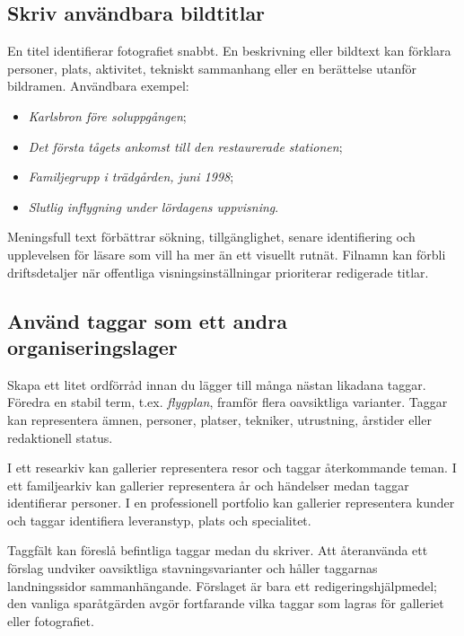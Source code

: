 \documentclass[11pt,a4paper]{article}
\begin{document}
\subsection{Skriv användbara bildtitlar}

En titel identifierar fotografiet snabbt. En beskrivning eller bildtext kan
förklara personer, plats, aktivitet, tekniskt sammanhang eller en berättelse
utanför bildramen. Användbara exempel:

\begin{itemize}
  \item \emph{Karlsbron före soluppgången};
  \item \emph{Det första tågets ankomst till den restaurerade stationen};
  \item \emph{Familjegrupp i trädgården, juni 1998};
  \item \emph{Slutlig inflygning under lördagens uppvisning}.
\end{itemize}

Meningsfull text förbättrar sökning, tillgänglighet, senare identifiering och
upplevelsen för läsare som vill ha mer än ett visuellt rutnät. Filnamn kan
förbli driftsdetaljer när offentliga visningsinställningar prioriterar
redigerade titlar.

\subsection{Använd taggar som ett andra organiseringslager}

Skapa ett litet ordförråd innan du lägger till många nästan likadana taggar.
Föredra en stabil term, t.ex. \emph{flygplan}, framför flera oavsiktliga
varianter. Taggar kan representera ämnen, personer, platser, tekniker,
utrustning, årstider eller redaktionell status.

I ett researkiv kan gallerier representera resor och taggar återkommande teman.
I ett familjearkiv kan gallerier representera år och händelser medan taggar
identifierar personer. I en professionell portfolio kan gallerier representera
kunder och taggar identifiera leveranstyp, plats och specialitet.

Taggfält kan föreslå befintliga taggar medan du skriver. Att återanvända ett
förslag undviker oavsiktliga stavningsvarianter och håller taggarnas
landningssidor sammanhängande. Förslaget är bara ett redigeringshjälpmedel; den
vanliga sparåtgärden avgör fortfarande vilka taggar som lagras för galleriet
eller fotografiet.
\end{document}
